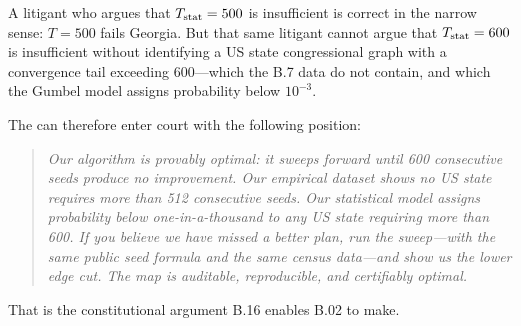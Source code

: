 A litigant who argues that $T_{\mathrm{stat}} = 500$ is insufficient is correct in the
narrow sense: $T = 500$ fails Georgia.
But that same litigant cannot argue that $T_{\mathrm{stat}} = 600$ is insufficient without
identifying a US state congressional graph with a convergence tail exceeding
600---which the B.7 data do not contain, and which the Gumbel model assigns
probability below $10^{-3}$.

The \dia{} can therefore enter court with the following position:
\begin{quote}
  \itshape
  Our algorithm is provably optimal: it sweeps forward until 600 consecutive
  seeds produce no improvement.
  Our empirical dataset shows no US state requires more than 512 consecutive
  seeds.
  Our statistical model assigns probability below one-in-a-thousand to any US
  state requiring more than 600.
  If you believe we have missed a better plan, run the sweep---with the same
  public seed formula and the same census data---and show us the lower edge cut.
  The map is auditable, reproducible, and certifiably optimal.
\end{quote}

That is the constitutional argument B.16 enables B.02 to make.
